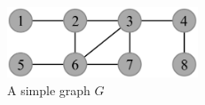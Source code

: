 {\begin{columns}
\begin{column}{0.5\textwidth}
\begin{center}
\begin{textblock*}{8cm}
          \begin{figure}
            \centering
            \includegraphics[width=5.7cm]{../figures/algorithm1.pdf}
            \caption*{A simple graph $G$}
          \end{figure}
        \end{textblock*}
      \end{center}
    \end{column}
  \end{columns}
}

